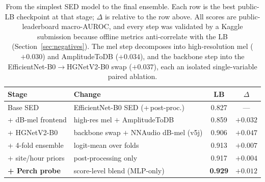 \begin{table}[t]
  \centering
  \small
  \caption{From the simplest SED model to the final ensemble. Each row is the best public-LB
  checkpoint at that stage; $\Delta$ is relative to the row above. All scores are
  public-leaderboard macro-AUROC, and every step was validated by a Kaggle submission because
  offline metrics anti-correlate with the LB (Section~\ref{sec:negatives}). The mel step
  decomposes into high-resolution mel ($+0.030$) and AmplitudeToDB ($\mathbf{+0.034}$), and the
  backbone step into the EfficientNet-B0$\rightarrow$HGNetV2-B0 swap ($\mathbf{+0.037}$), each an
  isolated single-variable paired ablation.}
  \label{tab:ablation-ladder}
  \begin{tabular}{@{}llcc@{}}
    \toprule
    Stage & Change & LB & $\Delta$ \\
    \midrule
    Base SED            & EfficientNet-B0 SED (+\,post-proc.)               & 0.827 & --- \\
    + dB-mel frontend   & high-res mel $+$ AmplitudeToDB                    & 0.859 & $+0.032$ \\
    + HGNetV2-B0        & backbone swap $+$ NNAudio dB-mel (v5j)            & 0.906 & $+0.047$ \\
    + 4-fold ensemble   & logit-mean over folds                            & 0.913 & $+0.007$ \\
    + site/hour priors  & post-processing only                             & 0.917 & $+0.004$ \\
    \midrule
    \textbf{+ Perch probe} & score-level blend (MLP-only)                  & \textbf{0.929} & $+0.012$ \\
    \bottomrule
  \end{tabular}
\end{table}
